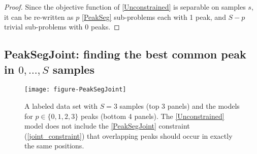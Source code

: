 \documentclass{article} %
\DeclareMathOperator*{\argmin}{arg\,min}
\begin{document}
\begin{proof}
  Since the objective function of \ref{Unconstrained} is separable on
  samples $s$, it can be re-written as $p$ \ref{PeakSeg} sub-problems
  each with 1 peak, and $S-p$ trivial sub-problems with 0 peaks.
  


\end{proof}

\subsection{PeakSegJoint: finding the best common peak in $0,\dots, S$
  samples}

\begin{figure}[b!]
  \centering
  \texttt{[image: figure-PeakSegJoint]}
  \caption{A labeled data set with $S=3$ samples (top 3 panels) and
    the models for $p\in\{0, 1, 2, 3\}$ peaks (bottom 4 panels). The
    \ref{Unconstrained} model does not include the \ref{PeakSegJoint}
    constraint (\ref{joint_constraint}) that overlapping peaks should
    occur in exactly the same positions.}
  \label{fig:PeakSegJoint}
\end{figure}
\end{document}
